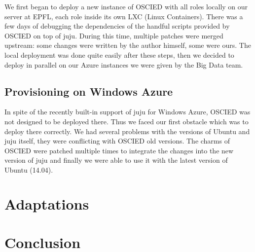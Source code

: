 \documentclass[a4paper,12pt]{article}
\begin{document}
We first began to deploy a new instance of OSCIED with all roles locally on our server at EPFL, each role inside its own LXC (Linux Containers).
There was a few days of debugging the dependencies of the handful scripts provided by OSCIED on top of juju.
During this time, multiple patches were merged upstream: some changes were written by the author himself, some were ours.
The local deployment was done quite easily after these steps, then we decided to deploy in parallel on our Azure instances we were given by the Big Data team.

\subsection{Provisioning on Windows Azure}
In spite of the recently built-in support of juju for Windows Azure, OSCIED was not designed to be deployed there.
Thus we faced our first obstacle which was to deploy there correctly.
We had several problems with the versions of Ubuntu and juju itself, they were conflicting with OSCIED old versions.
The charms of OSCIED were patched multiple times to integrate the changes into the new version of juju and finally we were able to use it with the latest version of Ubuntu (14.04).


\section{Adaptations}

\section{Conclusion}
\end{document}
